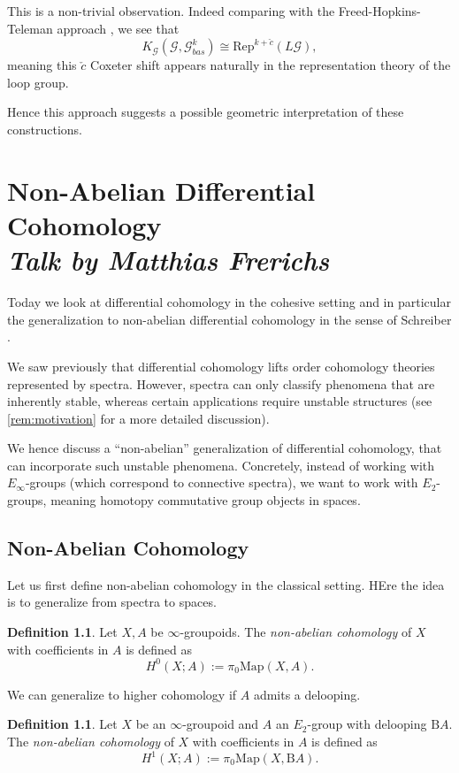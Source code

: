 \documentclass[a4paper]{book}
\newcommand{\lG}{\mathcal{G}}
\theoremstyle{definition}
\newtheorem{definition}[equation]{Definition}
\theoremstyle{remark}
\numberwithin{equation}{section}
\begin{document}
This is a non-trivial observation. Indeed comparing with the Freed-Hopkins-Teleman approach \cite{freedhopkinsteleman2011loopgroupsi}, we see that 
\[K_{\lG}(\lG, \lG^k_{bas}) \cong \mathrm{Rep}^{k + \check{c}}(L\lG), \]
meaning this $\check{c}$ Coxeter shift appears naturally	in the representation theory of the loop group. 

Hence this approach suggests a possible geometric interpretation of these constructions.

\chapter{Non-Abelian Differential Cohomology \texorpdfstring{\\}{ } \normalsize \emph{Talk by Matthias Frerichs}}

Today we look at differential cohomology in the cohesive setting and in particular the generalization to non-abelian differential cohomology in the sense of Schreiber \cite{schreiber2013cohesive,fiorenzasatischreiber2024charactermap}.

We saw previously that differential cohomology lifts order cohomology theories represented by spectra. However, spectra can only classify phenomena that are inherently stable, whereas certain applications require unstable structures (see \cref{rem:motivation} for a more detailed discussion).

We hence discuss a ``non-abelian'' generalization of differential cohomology, that can incorporate such unstable phenomena. Concretely, instead of working with $E_\infty$-groups (which correspond to connective spectra), we want to work with $E_2$-groups, meaning homotopy commutative group objects in spaces.

\section{Non-Abelian Cohomology}
Let us first define non-abelian cohomology in the classical setting. HEre the idea is to generalize from spectra to spaces.

\begin{definition}
	Let $X, A$ be $\infty$-groupoids. The \emph{non-abelian cohomology} of $X$ with coefficients in $A$ is defined as
	\[	H^0(X; A) := \pi_0 \mathrm{Map}(X, A). \]
\end{definition}

We can generalize to higher cohomology if $A$ admits a delooping.

\begin{definition}
	Let $X$ be an $\infty$-groupoid and $A$ an	$E_2$-group with delooping $\mathrm{B}A$. The \emph{non-abelian cohomology} of $X$ with coefficients in $A$ is defined as
	\[	H^1(X; A) := \pi_0 \mathrm{Map}(X, \mathrm{B} A). \]
\end{definition}	
\end{document}
